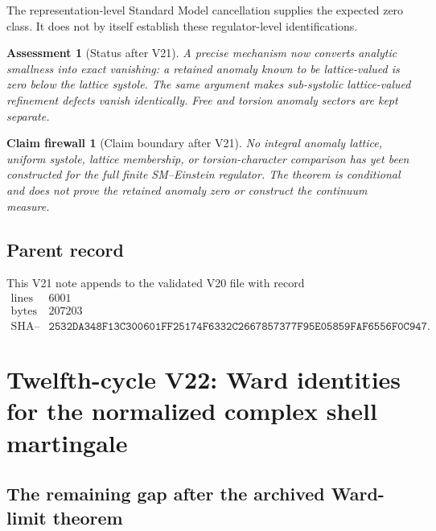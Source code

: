\documentclass[11pt]{article}
\newtheorem{firewall}[theorem]{Claim firewall}
\newtheorem{assessment}[theorem]{Assessment}
\theoremstyle{remark}
\begin{document}
The representation-level Standard Model cancellation supplies the
expected zero class.  It does not by itself establish these
regulator-level identifications.

\begin{assessment}[Status after V21]
\label{ass:v12v21-status}
A precise mechanism now converts analytic smallness into exact
vanishing: a retained anomaly known to be lattice-valued is zero
below the lattice systole.  The same argument makes sub-systolic
lattice-valued refinement defects vanish identically.  Free and
torsion anomaly sectors are kept separate.
\end{assessment}

\begin{firewall}[Claim boundary after V21]
\label{fire:v12v21-claim}
No integral anomaly lattice, uniform systole, lattice membership, or
torsion-character comparison has yet been constructed for the full
finite SM--Einstein regulator.  The theorem is conditional and does
not prove the retained anomaly zero or construct the continuum
measure.
\end{firewall}

\subsection{Parent record}

This V21 note appends to the validated V20 file with record
\[
\begin{array}{c|c}
\text{lines}&6001\\
\text{bytes}&207203\\
\text{SHA--256}&
\texttt{2532DA348F13C300601FF25174F6332C2667857377F95E05859FAF6556F0C947}.
\end{array}
\]


\section{Twelfth-cycle V22: Ward identities for the normalized
complex shell martingale}
\label{sec:v12v22}

\subsection{The remaining gap after the archived Ward-limit theorem}
\end{document}
